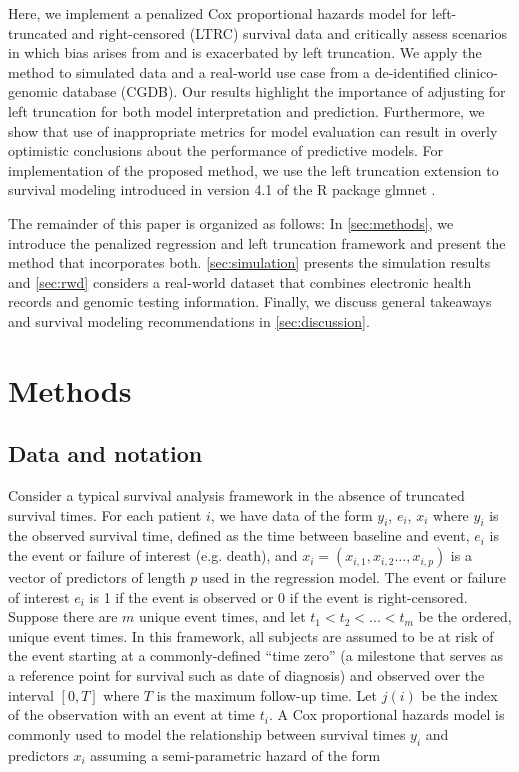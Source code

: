 \documentclass[11pt,final,fleqn]{article}\usepackage[]{graphicx}\usepackage[]{color}
\theoremstyle{plain}
\newcommand{\pkg}[1]{{\fontseries{b}\selectfont #1}}
\begin{document}
Here, we implement a penalized Cox proportional hazards model for left-truncated and right-censored (LTRC) survival data and critically assess scenarios in which bias arises from and is exacerbated by left truncation. We apply the method to simulated data and a real-world use case from a de-identified clinico-genomic database (CGDB). Our results highlight the importance of adjusting for left truncation for both model interpretation and prediction. Furthermore, we show that use of inappropriate metrics for model evaluation can result in overly optimistic conclusions about the performance of predictive models. For implementation of the proposed method, we use the left truncation extension to survival modeling introduced in version 4.1 of the \textsf{R} package \pkg{glmnet} \cite{glmnet}. 

The remainder of this paper is organized as follows: In \autoref{sec:methods}, we introduce the penalized regression and left truncation framework and present the method that incorporates both. \autoref{sec:simulation} presents the simulation results and \autoref{sec:rwd} considers a real-world dataset that combines electronic health records and genomic testing information. Finally, we discuss general takeaways and survival modeling recommendations in \autoref{sec:discussion}. 

\section{Methods} \label{sec:methods}

\subsection{Data and notation} 
Consider a typical survival analysis framework in the absence of truncated survival times. For each patient $i$, we have data of the form $y_i$, $e_i$, $x_i$ where $y_i$ is the observed survival time, defined as the time between baseline and event, $e_i$ is the event or failure of interest (e.g. death), and $x_i = (x_{i,1}, x_{i,2} \ldots, x_{i,p})$ is a vector of predictors of length $p$ used in the regression model. The event or failure of interest $e_i$ is 1 if the event is observed or 0 if the event is right-censored. Suppose there are $m$ unique event times, and let $t_1 < t_2 < ... < t_m$ be the ordered, unique event times. In this framework, all subjects are assumed to be at risk of the event starting at a commonly-defined ``time zero'' (a milestone that serves as a reference point for survival such as date of diagnosis) and observed over the interval $[0,T]$ where $T$ is the maximum follow-up time. Let $j(i)$ be the index of the observation with an event at time $t_i$. A Cox proportional hazards model is commonly used to model the relationship between survival times $y_i$ and predictors $x_i$ assuming a semi-parametric hazard of the form
\end{document}
